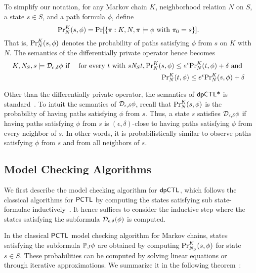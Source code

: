 To simplify our notation, for any Markov chain $K$, neighborhood
relation $N$ on $S$, a state $s \in S$, and a path formula $\phi$,
define
\[
\myPr{s}{K}{N}{\phi} =
\Pr [ \{ \pi : K, N, \pi \models \phi \textmd{ with } \pi_0 = s \} ].
\]
That is, $\myPr{s}{K}{N}{\phi}$ denotes the probability of paths
satisfying $\phi$ from $s$ on $K$ with $N$. The semantics of the
differentially private operator hence becomes
\begin{eqnarray*}
  K, \neighbor{S}, s \models \dpriv{\epsilon}{\delta} \phi
  & \textmd{ if } &
  \textmd{for every } t \textmd{ with }  s \neighbor{S} t,
      \myPr{s}{K}{N}{\phi} \leq e^{\epsilon} \myPr{t}{K}{N}{\phi} + \delta
      \textmd{ and }\\
  & &  \myPr{t}{K}{N}{\phi} \leq e^{\epsilon} \myPr{s}{K}{N}{\phi} + \delta
\end{eqnarray*}

Other than the differentially private operator, the semantics of
$\dpCTLstar$ is standard~\cite{BK:08:PMC}.
To intuit the semantics of $\dpriv{\epsilon}{\delta} \phi$,
recall that  $\myPr{s}{K}{N}{\phi}$ is the probability of having
paths satisfying $\phi$ from $s$. Thus, a state $s$ satisfies
$\dpriv{\epsilon}{\delta} \phi$ if having paths satisfying $\phi$
from $s$ is $(\epsilon, \delta)$-close to having paths satisfying
$\phi$ from every neighbor of $s$. In other words, it is
probabilistically similar to observe paths satisfying $\phi$ from $s$
and from all neighbors of $s$.

\subsection{Model Checking Algorithms}
We first describe the model checking algorithm for $\dpCTL$, which follows the classical
algorithms for $\PCTL$ by computing the states satisfying
sub state-formulae inductively~\cite{BK:08:PMC}. It hence suffices to
consider the inductive step where the states satisfying the subformula
$\dpriv{\epsilon}{\delta} (\phi)$ is computed.


In the classical $\PCTL$ model checking algorithm for Markov chains,
states satisfying the subformula $\PJ{J} \phi$ are obtained by
computing $\myPr{s}{K}{\neighbor{S}}{\phi}$ for state $s \in S$.
These probabilities can be computed by solving linear equations or
through iterative approximations. We summarize it in the following
theorem~\cite{BK:08:PMC}:

